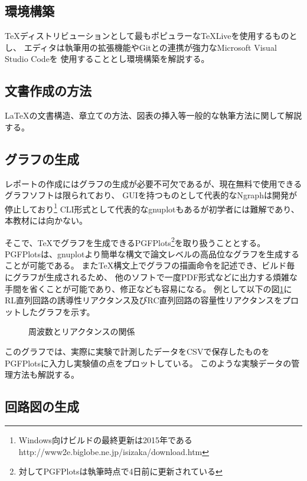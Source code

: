 \documentclass[uplatex]{jsarticle}
\begin{document}
    \subsection{環境構築}
        \TeX ディストリビューションとして最もポピュラーな\TeX Liveを使用するものとし、
        エディタは執筆用の拡張機能やGitとの連携が強力なMicrosoft Visual Studio Codeを
        使用することとし環境構築を解説する。

    \subsection{文書作成の方法}
        \LaTeX の文書構造、章立ての方法、図表の挿入等一般的な執筆方法に関して解説する。

    \subsection{グラフの生成}
        レポートの作成にはグラフの生成が必要不可欠であるが、現在無料で使用できるグラフソフトは限られており、
        GUIを持つものとして代表的なNgraphは開発が停止しており\footnote{Windows向けビルドの最終更新は2015年である http://www2e.biglobe.ne.jp/isizaka/download.htm}
        CLI形式として代表的なgnuplotもあるが初学者には難解であり、本教材には向かない。
        
        そこで、\TeX でグラフを生成できるPGFPlots\footnote{対してPGFPlotsは執筆時点で4日前に更新されている}を取り扱うこととする。
        PGFPlotsは、gnuplotより簡単な構文で論文レベルの高品位なグラフを生成することが可能である。
        また\TeX 構文上でグラフの描画命令を記述でき、ビルド毎にグラフが生成されるため、
        他のソフトで一度PDF形式などに出力する煩雑な手間を省くことが可能であり、修正なども容易になる。
        例として以下の図\ref{fig:XLXC}に
        RL直列回路の誘導性リアクタンス及びRC直列回路の容量性リアクタンスをプロットしたグラフを示す。
        
        \begin{figure}[H]
            \centering
            \caption{周波数とリアクタンスの関係}
            \label{fig:XLXC}
        \end{figure}

        このグラフでは、実際に実験で計測したデータをCSVで保存したものをPGFPlotsに入力し実験値の点をプロットしている。
        このような実験データの管理方法も解説する。

    \subsection{回路図の生成}
        
\end{document}
